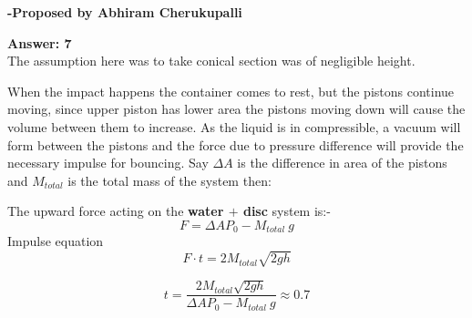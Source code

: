 \documentclass[11pt,a4paper]{scrartcl}
\begin{document}
\begin{flushright}
\textbf{\Large{-Proposed by Abhiram Cherukupalli}}
\end{flushright}
\begin{solution}

{\Large{\textbf{Answer: 7}}}\\

The assumption here was to take conical section was of negligible height.\newline

When the impact happens the container comes to rest, but the pistons continue moving, since upper piston has lower area the pistons moving down will cause the volume between them to increase. As the liquid is in compressible, a vacuum will form between the pistons and the force due to pressure difference will provide the necessary impulse for bouncing.
Say $\Delta A$ is the difference in area of the pistons and $M_{total}$ is the total mass of the system then:

The upward force acting on the \textbf{water $+$ disc} system is:-
$$F=\Delta A P_0 - M_{total}\ g$$ 
Impulse equation
$$F\cdot t  = 2M_{total}\sqrt{2gh}$$

$$t = \frac{2M_{total}\sqrt{2gh}}{\Delta A P_0 - M_{total}\ g} \approx 0.7$$

\end{solution}
\vspace{10mm}%
\end{document}

